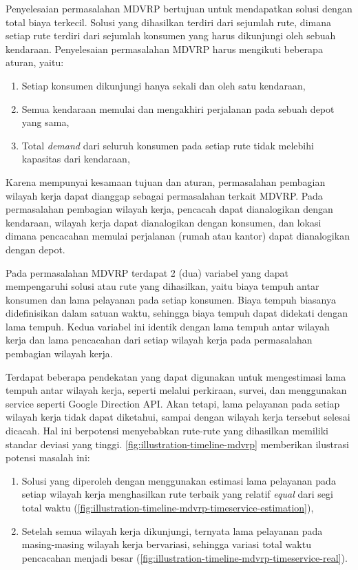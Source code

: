 Penyelesaian permasalahan MDVRP bertujuan untuk mendapatkan solusi dengan total biaya terkecil. Solusi yang dihasilkan terdiri dari sejumlah rute, dimana setiap rute terdiri dari sejumlah konsumen yang harus dikunjungi oleh sebuah kendaraan. Penyelesaian permasalahan MDVRP harus mengikuti beberapa aturan, yaitu:

\begin{enumerate}
	\item Setiap konsumen dikunjungi hanya sekali dan oleh satu kendaraan, 
	\item Semua kendaraan memulai dan mengakhiri perjalanan pada sebuah depot yang sama, 
	\item Total \textit{demand} dari seluruh konsumen pada setiap rute tidak melebihi kapasitas dari kendaraan, 
\end{enumerate}


Karena mempunyai kesamaan tujuan dan aturan, permasalahan pembagian wilayah kerja dapat dianggap sebagai permasalahan terkait MDVRP. Pada permasalahan pembagian wilayah kerja, pencacah dapat dianalogikan dengan kendaraan, wilayah kerja dapat dianalogikan dengan konsumen, dan lokasi dimana pencacahan memulai perjalanan (rumah atau kantor) dapat dianalogikan dengan depot.


Pada permasalahan MDVRP terdapat 2 (dua) variabel yang dapat mempengaruhi solusi atau rute yang dihasilkan, yaitu biaya tempuh antar konsumen dan lama pelayanan pada setiap konsumen. Biaya tempuh biasanya didefinisikan dalam satuan waktu, sehingga biaya tempuh dapat didekati dengan lama tempuh. Kedua variabel ini identik dengan lama tempuh antar wilayah kerja dan lama pencacahan dari setiap wilayah kerja pada permasalahan pembagian wilayah kerja. 


Terdapat beberapa pendekatan yang dapat digunakan untuk mengestimasi lama tempuh antar wilayah kerja, seperti melalui perkiraan, survei, dan menggunakan service seperti Google Direction API. Akan tetapi, lama pelayanan pada setiap wilayah kerja tidak dapat diketahui, sampai dengan wilayah kerja tersebut selesai dicacah. Hal ini berpotensi menyebabkan rute-rute yang dihasilkan memiliki standar deviasi yang tinggi. \autoref{fig:illustration-timeline-mdvrp} memberikan ilustrasi potensi masalah ini:

\begin{enumerate}
	\item Solusi yang diperoleh dengan menggunakan estimasi lama pelayanan pada setiap wilayah kerja menghasilkan rute terbaik yang relatif \textit{equal} dari segi total waktu (\autoref{fig:illustration-timeline-mdvrp-timeservice-estimation}), 
	\item Setelah semua wilayah kerja dikunjungi, ternyata lama pelayanan pada masing-masing wilayah kerja bervariasi, sehingga variasi total waktu pencacahan menjadi besar (\autoref{fig:illustration-timeline-mdvrp-timeservice-real}).
\end{enumerate}


